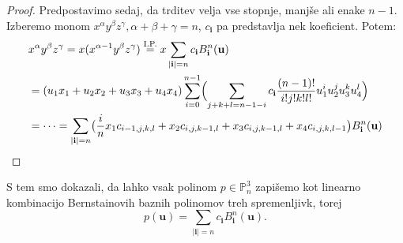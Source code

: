 \documentclass[a4paper, 12pt]{article}
\theoremstyle{definition} %
\newtheorem{definicija}{Definicija}[section]
\theoremstyle{plain} %
\newtheorem{corollary}{Posledica}[theorem]
\begin{document}
\begin{proof}
  Predpostavimo sedaj, da trditev velja vse stopnje, manjše ali enake $n-1$.
  Izberemo monom $x^\alpha y^\beta z^\gamma, \alpha+\beta+\gamma = n$, 
  $c_{\textbf{i}}$ pa predstavlja nek koeficient. Potem:
  \begin{align*}
    &x^\alpha y^\beta z^\gamma = x(x^{\alpha-1} y^\beta z^\gamma) \stackrel{\text{I.P.}}{=} 
    x\sum_{|\textbf{i}|=n}c_{\textbf{i}}B^n_{\textbf{i}}(\textbf{u})\\
    &=(u_1x_1+u_2x_2+u_3x_3+u_4x_4)\sum_{i=0}^{n-1}\Bigl(\sum_{j+k+l=n-1-i}c_{\textbf{i}}\frac{(n-1)!}{i!j!k!l!}u_1^iu_2^ju_3^ku_4^l\Bigr)\\
    &=\dots=\sum_{|\textbf{i}|=n}\bigl(\frac{i}{n}x_1c_{i-1,j,k,l}+x_2c_{i,j,k-1,l}+x_3c_{i,j,k-1,l}+x_4c_{i,j,k,l-1}\bigr)B_{\textbf{i}}^n(\textbf{u})
  \end{align*}
\end{proof}

S tem smo dokazali, da lahko vsak polinom $p\in\mathbb{P}_n^3$ zapišemo kot linearno kombinacijo 
Bernstainovih baznih polinomov treh spremenljivk, torej
$$
p(\textbf{u}) = \sum_{|\textbf{i}|=n}c_{\textbf{i}}B_{\textbf{i}}^n(\textbf{u}).
$$

%
%
%
\end{document}
